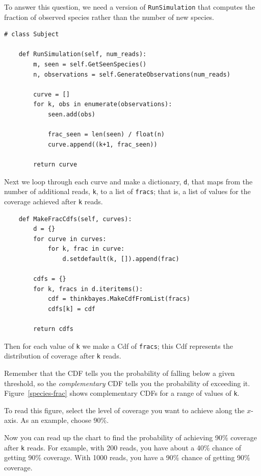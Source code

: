 \documentclass[12pt]{book}
\begin{document}
To answer this question, we need a version of {\tt RunSimulation}
that computes the fraction of observed species rather than the
number of new species.

\begin{verbatim}
# class Subject

    def RunSimulation(self, num_reads):
        m, seen = self.GetSeenSpecies()
        n, observations = self.GenerateObservations(num_reads)

        curve = []
        for k, obs in enumerate(observations):
            seen.add(obs)

            frac_seen = len(seen) / float(n)
            curve.append((k+1, frac_seen))

        return curve
\end{verbatim}

Next we loop through each curve and make a dictionary, {\tt d},
that maps from the number of additional reads, {\tt k}, to
a list of {\tt fracs}; that is, a list of values for the
coverage achieved after {\tt k} reads.

\begin{verbatim}
    def MakeFracCdfs(self, curves):
        d = {}
        for curve in curves:
            for k, frac in curve:
                d.setdefault(k, []).append(frac)

        cdfs = {}
        for k, fracs in d.iteritems():
            cdf = thinkbayes.MakeCdfFromList(fracs)
            cdfs[k] = cdf

        return cdfs
\end{verbatim}

Then for each value of {\tt k} we make a Cdf of {\tt fracs}; this Cdf
represents the distribution of coverage after {\tt k} reads.

Remember that the CDF tells you the probability of falling below a
given threshold, so the {\em complementary} CDF tells you the
probability of exceeding it.  Figure~\ref{species-frac} shows
complementary CDFs for a range of values of {\tt k}.

To read this figure, select the level of coverage you want to achieve
along the $x$-axis.  As an example, choose 90\%.

Now you can read up the chart to find the probability of achieving
90\% coverage after {\tt k} reads.  For example, with 200 reads,
you have about a 40\% chance of getting 90\% coverage.  With 1000 reads, you
have a 90\% chance of getting 90\% coverage.
\end{document}
